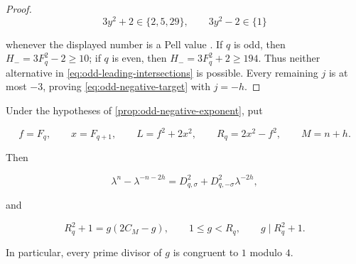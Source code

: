 \begin{proof}
\begin{equation}
 3y^2+2\in\{2,5,29\},
 \qquad
 3y^2-2\in\{1\}
 \label{eq:odd-near-square-values}
\end{equation}

whenever the displayed number is a Pell value
\cite[Table~1]{AlekseyevTengely2014}. If $q$ is odd, then
$H_-=3F_q^2-2\geqslant10$; if $q$ is even, then
$H_-=3F_q^2+2\geqslant194$. Thus neither alternative in
\cref{eq:odd-leading-intersections} is possible. Every remaining $j$ is at
most $-3$, proving \cref{eq:odd-negative-target} with $j=-h$.
\end{proof}

\begin{lemma}
\label{lem:odd-factorization}
Under the hypotheses of \cref{prop:odd-negative-exponent}, put

\begin{equation}
 f=F_q,
 \qquad
 x=F_{q+1},
 \qquad
 L=f^2+2x^2,
 \qquad
 R_q=2x^2-f^2,
 \qquad
 M=n+h.
\end{equation}

Then

\begin{equation}
 \lambda^n-\lambda^{-n-2h}
 =D_{q,\sigma}^2+D_{q,-\sigma}^2\lambda^{-2h},
 \label{eq:odd-trace}
\end{equation}

and

\begin{equation}
 R_q^2+1=g(2C_M-g),
 \qquad
 1\leqslant g<R_q,
 \qquad
 g\mid R_q^2+1.
 \label{eq:odd-content-factorization}
\end{equation}

In particular, every prime divisor of $g$ is congruent to $1$ modulo $4$.
\end{lemma}


